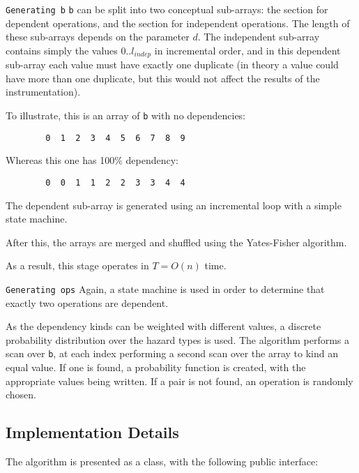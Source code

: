 		\texttt{Generating \texttt{b}} \label{sec:methodology/params/algo/gen-b}
		\texttt{b} can be split into two conceptual sub-arrays: the section for dependent operations, and the section for independent operations. The length of these sub-arrays depends on the parameter $d$. The independent sub-array contains simply the values $0..l_{indep}$ in incremental order, and in this dependent sub-array each value must have exactly one duplicate (in theory a value could have more than one duplicate, but this would not affect the results of the instrumentation).
		
		To illustrate, this is an array of \texttt{b} with no dependencies:
		
		\begin{verbatim}
		0  1  2  3  4  5  6  7  8  9
		\end{verbatim}
		
		Whereas this one has 100\% dependency:
		
		\begin{verbatim}
		0  0  1  1  2  2  3  3  4  4
		\end{verbatim}
		
		The dependent sub-array is generated using an incremental loop with a simple state machine.
		
		After this, the arrays are merged and shuffled using the Yates-Fisher algorithm.
		
		As a result, this stage operates in $T=O(n)$ time.
		
		\texttt{Generating \texttt{ops}} \label{sec:methodology/params/algo/gen-ops}
		Again, a state machine is used in order to determine that exactly two operations are dependent.
		
		As the dependency kinds can be weighted with different values, a discrete probability distribution over the hazard types is used. The algorithm performs a scan over \texttt{b}, at each index performing a second scan over the array to kind an equal value. If one is found, a probability function is created, with the appropriate values being written. If a pair is not found, an operation is randomly chosen.
	
	\subsection{Implementation Details} \label{sec:methodology/params/implementation}
	The algorithm is presented as a class, with the following public interface:
	
